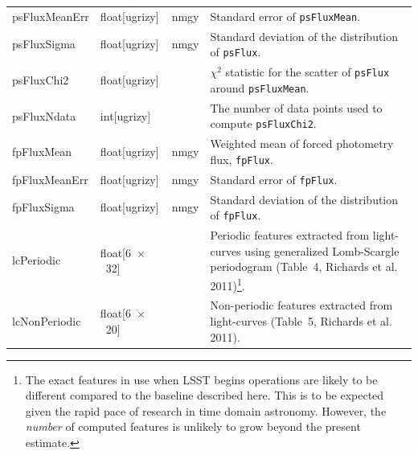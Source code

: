 \documentclass[12pt]{article}
\newcommand\x         {\hbox{$\times$}}
\begin{document}
\begin{center}
\begin{longtable}{p{3cm}p{2cm}p{2cm}p{5cm}}
psFluxMeanErr & float[ugrizy] & nmgy & Standard error of {\tt psFluxMean}.  \\

psFluxSigma & float[ugrizy] & nmgy & Standard deviation of the distribution of {\tt psFlux}. \\

psFluxChi2 & float[ugrizy] & ~ & $\chi^2$ statistic for the scatter of {\tt psFlux} around {\tt psFluxMean}. \\

psFluxNdata & int[ugrizy] & ~ & The number of data points used to compute {\tt psFluxChi2}. \\

fpFluxMean & float[ugrizy] & nmgy & Weighted mean of forced photometry flux, {\tt fpFlux}.\\

fpFluxMeanErr & float[ugrizy] & nmgy & Standard error of {\tt fpFlux}. \\

fpFluxSigma & float[ugrizy] & nmgy & Standard deviation of the distribution of {\tt fpFlux}. \\





lcPeriodic & float[6~\x~32] & ~ & Periodic features extracted from light-curves using generalized Lomb-Scargle periodogram (Table~4, Richards et al. 2011)\footnote{The exact features in use when LSST begins operations are likely to be different compared to the baseline described here. This is to be expected given the rapid pace of research in time domain astronomy. However, the {\em number} of computed features is unlikely to grow beyond the present estimate.}. \\

lcNonPeriodic & float[6~\x~20] & ~ & Non-periodic features extracted from light-curves (Table~5, Richards et al. 2011). \\


\end{longtable}
\end{center}
\end{document}

